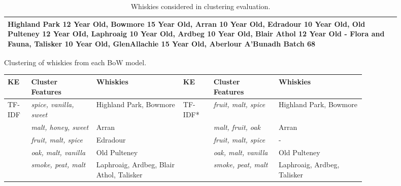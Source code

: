 \begin{table}
    \centering
    \caption{Whiskies considered in clustering evaluation.} \label{tab:clustwhisk}
    \begin{tabular}{p{0.9\linewidth}} 
    \toprule
    Highland Park 12 Year Old, Bowmore 15 Year Old, Arran 10 Year Old, Edradour 10 Year Old, Old Pulteney 12 Year OId, Laphroaig 10 Year Old, Ardbeg 10 Year Old, Blair Athol 12 Year Old - Flora and Fauna, Talisker 10 Year Old, GlenAllachie 15 Year Old, Aberlour A'Bunadh Batch 68  \\
    \bottomrule
    \end{tabular}
\end{table}

\begin{threeparttable}
    \centering
    \raggedright
    \caption{Clustering of whiskies from each BoW model.}\label{tab:clusters}
    \begin{tabular}{p{0.05\linewidth} p{0.15\linewidth} p{0.2\linewidth}|p{0.07\linewidth} p{0.15\linewidth} p{0.2\linewidth}} 
    \toprule
    KE     & Cluster Features                 & \multicolumn{1}{l}{Whiskies}                                                                                    & KE      & Cluster Features              & Whiskies                                                \\
    \midrule
    TF-IDF & \textit{spice, vanilla, sweet}   & Highland Park, Bowmore                                                                                          & TF-IDF* & \textit{fruit, malt, spice}   & Highland Park, Bowmore                                  \\
         & \textit{malt, honey, sweet}      & Arran                                                                                                           &  & \textit{malt, fruit, oak}     & Arran                                                   \\
         & \textit{fruit, malt, spice}      & Edradour                                                                                                        &  & \textit{fruit, malt, spice}   & -                                                       \\
         & \textit{oak, malt, vanilla}      & Old Pulteney                                                                                                    &  & \textit{oak, malt, vanilla}   & Old Pulteney                                            \\
         & \textit{smoke, peat, malt}       & Laphroaig, Ardbeg, Blair Athol, Talisker                                                                        &  & \textit{smoke, peat, malt}    & Laphroaig, Ardbeg, Talisker                             \\

\end{tabular}
\end{threeparttable}
